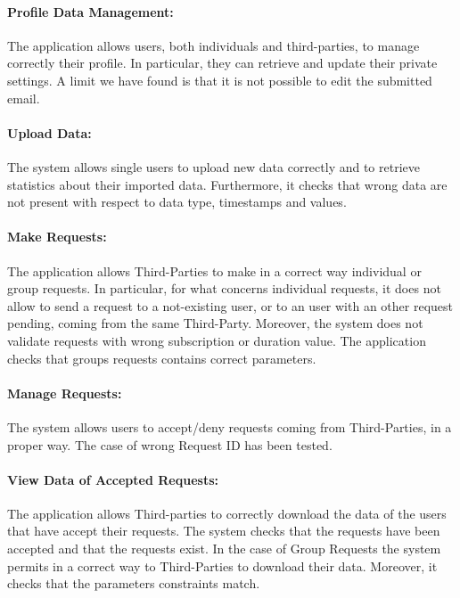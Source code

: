 \documentclass[a4paper]{article}
\begin{document}
\paragraph{Profile Data Management:}
The application allows users, both individuals and third-parties, to manage correctly their profile. In particular, they can retrieve and update their private settings. A limit we have found is that it is not possible to edit the submitted email.

\paragraph{Upload Data:}
The system allows single users to upload new data correctly and to retrieve statistics about their imported data. Furthermore, it checks that wrong data  are not present with respect to data type, timestamps and values.

\paragraph{Make Requests:}
The application allows Third-Parties to make in a correct way individual or group requests. In particular, for what concerns individual requests, it does not allow  to send a request to a not-existing user, or to an user with an other request pending, coming from the same Third-Party. Moreover, the system does not validate requests with wrong subscription or duration value. The application checks that groups requests contains correct parameters.

\paragraph{Manage Requests:}
The system allows users to accept/deny requests coming from Third-Parties, in a proper way. The case of wrong Request ID has been tested.

\paragraph{View Data of Accepted Requests:}
The application allows Third-parties to correctly download the data of the users that have accept their requests. The system checks that the requests have been accepted and that the requests exist. In the case of Group Requests the system permits in a correct way to Third-Parties to download their data. Moreover, it checks that the parameters constraints match. 
\end{document}
